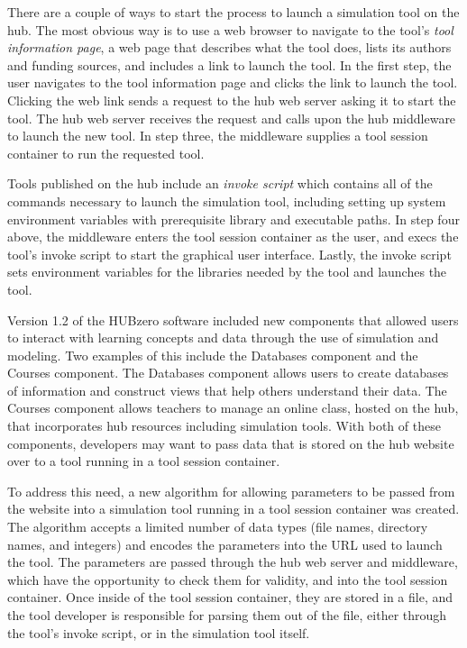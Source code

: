 There are a couple of ways to start the process to launch a simulation tool on
the hub. The most obvious way is to use a web browser to navigate to the tool's
\textit{tool information page}, a web page that describes what the tool does,
lists its authors and funding sources, and includes a link to launch the tool.
In the first step, the user navigates to the tool information page and clicks
the link to launch the tool.  Clicking the web link sends a request to the hub
web server asking it to start the tool. The hub web server receives the request
and calls upon the hub middleware to launch the new tool.  In step three, the
middleware supplies a tool session container to run the requested tool.

Tools published on the hub include an \textit{invoke script} which contains all
of the commands necessary to launch the simulation tool, including setting up
system environment variables with prerequisite library and executable paths.
In step four above, the middleware enters the tool session container as the
user, and execs the tool's invoke script to start the graphical user interface.
Lastly, the invoke script sets environment variables for the libraries needed
by the tool and launches the tool.

Version 1.2 of the HUBzero software included new components that allowed users
to interact with learning concepts and data through the use of simulation and
modeling. Two examples of this include the Databases component and the Courses
component. The Databases component allows users to create databases of
information and construct views that help others understand their data. The
Courses component allows teachers to manage an online class, hosted on the hub,
that incorporates hub resources including simulation tools.  With both of these
components, developers may want to pass data that is stored on the hub website
over to a tool running in a tool session container.

To address this need, a new algorithm for allowing parameters to be passed from
the website into a simulation tool running in a tool session container was
created. The algorithm accepts a limited number of data types (file names,
directory names, and integers) and encodes the parameters into the URL used to
launch the tool. The parameters are passed through the hub web server and
middleware, which have the opportunity to check them for validity, and into the
tool session container. Once inside of the tool session container, they are
stored in a file, and the tool developer is responsible for parsing them out of
the file, either through the tool's invoke script, or in the simulation tool
itself.

